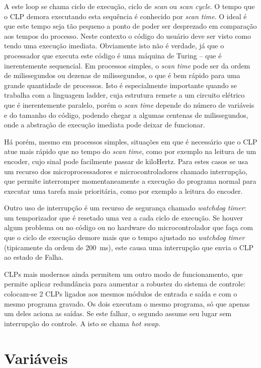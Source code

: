 A este loop se chama ciclo de execução, ciclo de \emph{scan} ou \emph{scan cycle}. O tempo que o CLP demora executando esta sequência é conhecido por \emph{scan time}. O ideal é que este tempo seja tão pequeno a ponto de poder ser desprezado em comparação aos tempos do processo. Neste contexto o código do usuário deve ser visto como tendo uma execução imediata. Obviamente isto não é verdade, já que o processador que executa este código é uma máquina de Turing -- que é inerentemente sequencial. Em processos simples, o \emph{scan time} pode ser da ordem de milissegundos ou dezenas de milissegundos, o que é bem rápido para uma grande quantidade de processos. Isto é especialmente importante quando se trabalha com a linguagem ladder, cuja estrutura remete a um circuito elétrico que é inerentemente paralelo, porém o \emph{scan time} depende do número de variáveis e do tamanho do código, podendo chegar a algumas centenas de milissegundos, onde a abstração de execução imediata pode deixar de funcionar.

Há porém, mesmo em processos simples, situações em que é necessário que o CLP atue mais rápido que no tempo do \emph{scan time}, como por exemplo na leitura de um encoder, cujo sinal pode facilmente passar de kiloHertz. Para estes casos se usa um recurso dos microprocessadores e microcontroladores chamado interrupção, que permite interromper momentaneamente a execução do programa normal para executar uma tarefa mais prioritária, como por exemplo a leitura do encoder.

Outro uso de interrupção é um recurso de segurança chamado \emph{watchdog timer}: um temporizador que é resetado uma vez a cada ciclo de execução. Se houver algum problema ou no código ou no hardware do microcontrolador que faça com que o ciclo de execução demore mais que o tempo ajustado no \emph{watchdog timer} (tipicamente da ordem de \SI{200}{\milli\second}), este causa uma interrupção que envia o CLP ao estado de Falha.

CLPs mais modernos ainda permitem um outro modo de funcionamento, que permite aplicar redundância para aumentar a robustez do sistema de controle: colocam-se 2 CLPs ligados aos mesmos módulos de entrada e saída e com o mesmo programa gravado. Os dois executam o mesmo programa, só que apenas um deles aciona as saídas. Se este falhar, o segundo assume seu lugar sem interrupção do controle. A isto se chama \emph{hot swap}.

\section{Variáveis}

